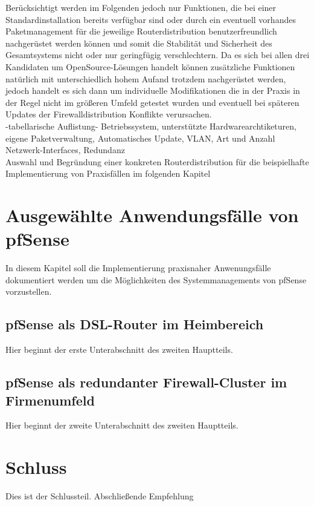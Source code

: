 \documentclass[a4paper,12pt]{scrartcl}
\begin{document}
Ber\"ucksichtigt werden im Folgenden jedoch nur Funktionen, die bei einer
Standardinstallation bereits verf\"ugbar sind oder durch ein eventuell
vorhandes Paketmanagement f\"ur die jeweilige Routerdistribution
benutzerfreundlich nachger\"ustet werden k\"onnen und somit die Stabilit\"at
und Sicherheit des Gesamtsystems nicht oder nur geringf\"ugig verschlechtern.
Da es sich bei allen drei Kandidaten um OpenSource-L\"osungen handelt k\"onnen
zus\"atzliche Funktionen nat\"urlich mit unterschiedlich hohem Aufand trotzdem
nachger\"ustet werden, jedoch handelt es sich dann um individuelle
Modifikationen die in der Praxis in der Regel nicht im gr\"o\ss{}eren Umfeld
getestet wurden und eventuell bei sp\"ateren Updates der Firewalldistribution
Konflikte verursachen.\\

-tabellarische Auflistung-
Betriebssystem, unterst\"utzte Hardwarearchtiketuren, eigene Paketverwaltung,
Automatisches Update, VLAN, Art und Anzahl Netzwerk-Interfaces, Redundanz\\


Auswahl und Begr\"undung einer konkreten Routerdistribution f\"ur die
beispielhafte Implementierung von Praxisf\"allen im folgenden Kapitel

\section{Ausgew\"ahlte Anwendungsf\"alle von pfSense}
In diesem Kapitel soll die Implementierung praxisnaher Anwenungsf\"alle
dokumentiert werden um die M\"oglichkeiten des Systemmanagements von pfSense
vorzustellen. 

\subsection{pfSense als DSL-Router im Heimbereich}
Hier beginnt der erste Unterabschnitt des zweiten Hauptteils.

\subsection{pfSense als redundanter Firewall-Cluster im Firmenumfeld}
Hier beginnt der zweite Unterabschnitt des zweiten Hauptteils.


\section{Schluss}
Dies ist der Schlussteil. Abschlie\ss{}ende Empfehlung
\clearpage
\end{document}
